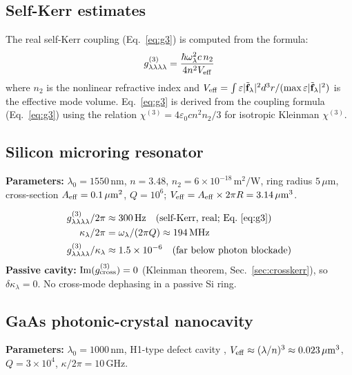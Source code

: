 \documentclass[12pt]{article}
\newcommand{\tf}{\tilde{\mathbf{f}}}
\begin{document}
\subsection{Self-Kerr estimates}

The real self-Kerr coupling (Eq.~\ref{eq:g3}) is computed from
the formula:
\begin{equation}
  g^{(3)}_{\lambda\lambda\lambda\lambda} =
  \frac{\hbar\omega_\lambda^2 c\, n_2}{4n^2 V_{\rm eff}}
  \label{eq:g3_n2_formula}
\end{equation}
where $n_2$ is the nonlinear refractive index and
$V_{\rm eff} = \int \varepsilon|\tf_\lambda|^2 d^3r /
(\max\varepsilon|\tf_\lambda|^2)$ is the effective mode volume.
Eq.~\eqref{eq:g3} is derived from the coupling formula
(Eq.~\ref{eq:g3}) using the relation
$\chi^{(3)} = 4\varepsilon_0 c n^2 n_2/3$ for isotropic Kleinman $\chi^{(3)}$.

\subsection{Silicon microring resonator}

\textbf{Parameters:} $\lambda_0=1550\,\mathrm{nm}$, $n=3.48$,
$n_2=6\times10^{-18}\,\mathrm{m}^2/\mathrm{W}$, ring radius $5\,\mu\mathrm{m}$,
cross-section $A_{\rm eff}=0.1\,\mu\mathrm{m}^2$, $Q=10^6$;
$V_{\rm eff} = A_{\rm eff}\times 2\pi R = 3.14\,\mu\mathrm{m}^3$.

\begin{align}
  g^{(3)}_{\lambda\lambda\lambda\lambda}/2\pi &\approx 300\,\mathrm{Hz}
  \quad\text{(self-Kerr, real; Eq.~\ref{eq:g3})}\\
  \kappa_\lambda/2\pi &= \omega_\lambda/(2\pi Q) \approx 194\,\mathrm{MHz}\\
  g^{(3)}_{\lambda\lambda\lambda\lambda}/\kappa_\lambda &\approx 1.5\times10^{-6}
  \quad\text{(far below photon blockade)}
\end{align}
\textbf{Passive cavity:}
$\mathrm{Im}(g^{(3)}_{\rm cross}) = 0$ (Kleinman theorem, Sec.~\ref{sec:crosskerr}),
so $\delta\kappa_\lambda = 0$. No cross-mode dephasing in a passive Si ring.

\subsection{GaAs photonic-crystal nanocavity}

\textbf{Parameters:} $\lambda_0=1000\,\mathrm{nm}$, H1-type defect cavity
\cite{Nozaki2012}, $V_{\rm eff}\approx(\lambda/n)^3\approx 0.023\,\mu\mathrm{m}^3$,
$Q=3\times10^4$, $\kappa/2\pi = 10\,\mathrm{GHz}$.
\end{document}
